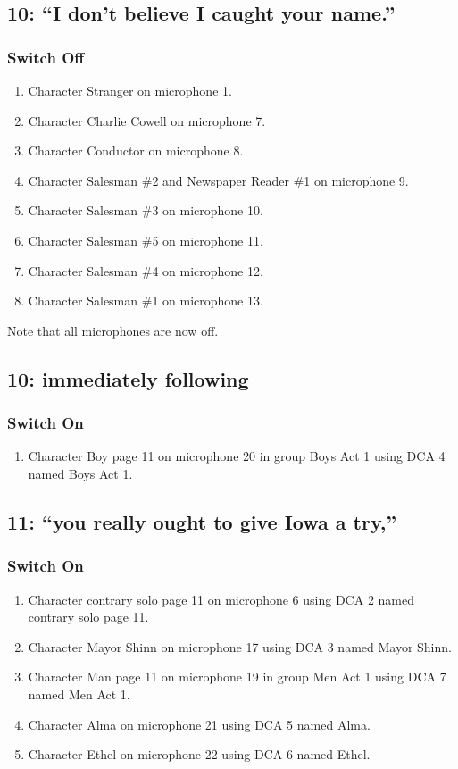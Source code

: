 \subsection* {10: ``I don't believe I caught your name.''}
\subsubsection* {Switch Off}
\begin{enumerate}
\item Character Stranger on microphone 1.
\item Character Charlie Cowell on microphone 7.
\item Character Conductor on microphone 8.
\item Character Salesman \#2 and Newspaper Reader \#1 on microphone 9.
\item Character Salesman \#3 on microphone 10.
\item Character Salesman \#5 on microphone 11.
\item Character Salesman \#4 on microphone 12.
\item Character Salesman \#1 on microphone 13.
\end{enumerate}
Note that all microphones are now off.
\subsection* {10: immediately following}
\subsubsection* {Switch On}
\begin{enumerate}
\item Character Boy page 11 on microphone 20 in group Boys Act 1 using DCA 4 named Boys Act 1.
\end{enumerate}
\subsection* {11: ``you really ought to give Iowa a try,''}
\subsubsection* {Switch On}
\begin{enumerate}
\item Character contrary solo page 11 on microphone 6 using DCA 2 named contrary solo page 11.
\item Character Mayor Shinn on microphone 17 using DCA 3 named Mayor Shinn.
\item Character Man page 11 on microphone 19 in group Men Act 1 using DCA 7 named Men Act 1.
\item Character Alma on microphone 21 using DCA 5 named Alma.
\item Character Ethel on microphone 22 using DCA 6 named Ethel.
\end{enumerate}
